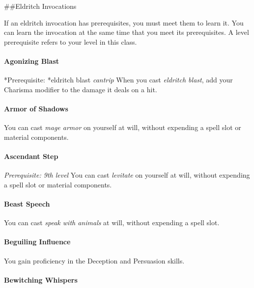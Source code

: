 \documentclass[
]{article}
\begin{document}
\#\#Eldritch Invocations

If an eldritch invocation has prerequisites, you must meet them to learn
it. You can learn the invocation at the same time that you meet its
prerequisites. A level prerequisite refers to your level in this class.

\hypertarget{agonizing-blast}{%
\paragraph{Agonizing Blast}\label{agonizing-blast}}

*Prerequisite: *eldritch blast \emph{cantrip} When you cast
\emph{eldritch blast}, add your Charisma modifier to the damage it deals
on a hit.

\hypertarget{armor-of-shadows}{%
\paragraph{Armor of Shadows}\label{armor-of-shadows}}

You can cast \emph{mage armor} on yourself at will, without expending a
spell slot or material components.

\hypertarget{ascendant-step}{%
\paragraph{Ascendant Step}\label{ascendant-step}}

\emph{Prerequisite: 9th level} You can cast \emph{levitate} on yourself
at will, without expending a spell slot or material components.

\hypertarget{beast-speech}{%
\paragraph{Beast Speech}\label{beast-speech}}

You can cast \emph{speak with animals} at will, without expending a
spell slot.

\hypertarget{beguiling-influence}{%
\paragraph{Beguiling Influence}\label{beguiling-influence}}

You gain proficiency in the Deception and Persuasion skills.

\hypertarget{bewitching-whispers}{%
\paragraph{Bewitching Whispers}\label{bewitching-whispers}}
\end{document}
